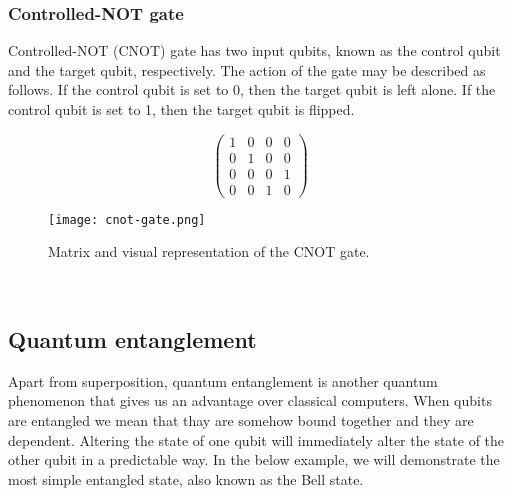 \subsubsection{Controlled-NOT gate} 
Controlled-NOT (CNOT) gate has two input qubits, known as the control qubit and the target qubit, respectively. The action of the gate may be described as follows. If the control qubit is set to 0, then the target qubit is left alone. If the control qubit is set to 1, then the target qubit is flipped. \cite{qc}

\begin{figure}[H]
  \centering
  \begin{minipage}{0.4\linewidth}
    \centering
    $$\begin{pmatrix}
      1 & 0 & 0 & 0 \\
      0 & 1 & 0 & 0 \\
      0 & 0 & 0 & 1 \\
      0 & 0 & 1 & 0
  \end{pmatrix}$$
    \vfill
  \end{minipage}
  \begin{minipage}{0.25\linewidth}
    \centering
    \texttt{[image: cnot-gate.png]}
    \vfill
  \end{minipage}
  \caption{Matrix and visual representation of the CNOT gate.}
\end{figure}

\\
\subsection{Quantum entanglement}
Apart from superposition, quantum entanglement is another quantum phenomenon that gives us an advantage over classical computers. When qubits are entangled we mean that thay are somehow bound together and they are dependent. Altering the state of one qubit will immediately alter the state of the other qubit in a predictable way. In the below example, we will demonstrate the most simple entangled state, also known as the Bell state.

